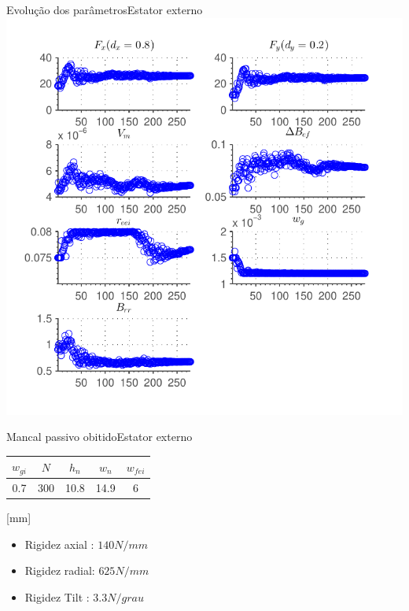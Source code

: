 \documentclass{beamer}
\begin{document}
\begin{frame}{Evolução dos parâmetros}{Estator externo}
\centering
	\includegraphics[width=0.8\linewidth]{Simulacoes/Passivo2/otimizacao_passivo_parametros.pdf}
\end{frame}

\begin{frame}{Mancal passivo obitido}{Estator externo}
\centering
	\begin{tabular}{c c c c c}
		 $w_{gi}$ 	& $N$ & $h_n$ & $w_n$ & $w_{fei}$  \\ \hline \hline
		 0.7		& 300  	& 10.8 	& 14.9	& 6
	\end{tabular} 
\hfill [mm]
\vspace{8px}
	
\begin{itemize}
	\item Rigidez axial : $140N/mm$
	\item Rigidez radial: $625N/mm$ 
	\item Rigidez Tilt  : $3.3N/grau$
\end{itemize}
	
\end{frame}
\end{document}
